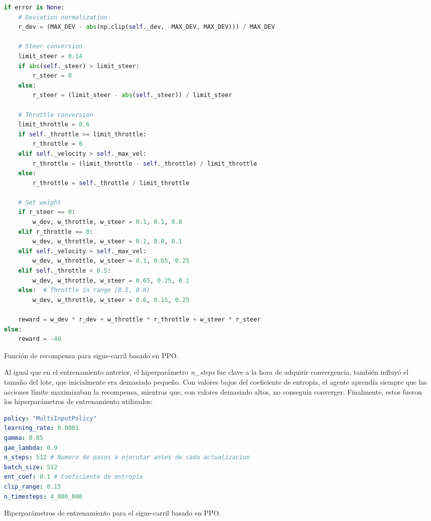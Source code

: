 \begin{code}[H]
\begin{lstlisting}[language=Python]
if error is None:
    # Deviation normalization
    r_dev = (MAX_DEV - abs(np.clip(self._dev, -MAX_DEV, MAX_DEV))) / MAX_DEV

    # Steer conversion
    limit_steer = 0.14
    if abs(self._steer) > limit_steer:
        r_steer = 0
    else:
        r_steer = (limit_steer - abs(self._steer)) / limit_steer

    # Throttle conversion
    limit_throttle = 0.6
    if self._throttle >= limit_throttle:
        r_throttle = 0
    elif self._velocity > self._max_vel:
        r_throttle = (limit_throttle - self._throttle) / limit_throttle
    else:
        r_throttle = self._throttle / limit_throttle

    # Set weight
    if r_steer == 0:
        w_dev, w_throttle, w_steer = 0.1, 0.1, 0.8
    elif r_throttle == 0:
        w_dev, w_throttle, w_steer = 0.1, 0.8, 0.1
    elif self._velocity > self._max_vel:
        w_dev, w_throttle, w_steer = 0.1, 0.65, 0.25
    elif self._throttle < 0.5:
        w_dev, w_throttle, w_steer = 0.65, 0.25, 0.1
    else:  # Throttle in range [0.5, 0.6)
        w_dev, w_throttle, w_steer = 0.6, 0.15, 0.25

    reward = w_dev * r_dev + w_throttle * r_throttle + w_steer * r_steer
else:
    reward = -40
\end{lstlisting}
\caption[Función de recompensa para sigue-carril basado en \ac{PPO}]{Función de recompensa para sigue-carril basado en \ac{PPO}.}
\label{cod:rew_ppo}
\end{code}

Al igual que en el entrenamiento anterior, el hiperparámetro \textit{n\_steps} fue clave a la hora de adquirir convergencia, también influyó el tamaño del lote, que inicialmente era demasiado pequeño. Con valores bajos del coeficiente de entropía, el agente aprendía siempre que las acciones límite maximizaban la recompensa, mientras que, con valores demasiado altos, no conseguía converger. Finalmente, estos fueron los hiperparámetros de entrenamiento utilizados:
\begin{code}[h]
\begin{lstlisting}[language=yaml]
policy: "MultiInputPolicy"
learning_rate: 0.0001
gamma: 0.85
gae_lambda: 0.9
n_steps: 512 # Numero de pasos a ejecutar antes de cada actualizacion
batch_size: 512 
ent_coef: 0.1 # Coeficiente de entropia
clip_range: 0.15 
n_timesteps: 4_000_000
\end{lstlisting}
\caption[Hiperparámetros de entrenamiento para el sigue-carril basado en \ac{PPO}]{Hiperparámetros de entrenamiento para el sigue-carril basado en \ac{PPO}.}
\label{cod:hiper_params_ppo}
\end{code}


